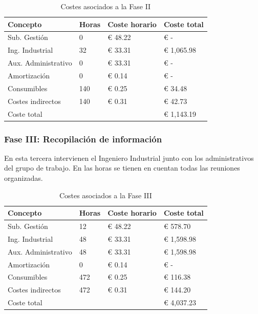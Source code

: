 \begin{table}[H]
    \centering
    \begin{tabular}{llll}
        \toprule
        Concepto            & Horas & Coste horario & Coste total \\
        \midrule
        Sub. Gestión        & 0     & € 48.22       & € -         \\
        Ing. Industrial     & 32    & € 33.31       & € 1,065.98  \\
        Aux. Administrativo & 0     & € 33.31       & € -         \\
        Amortización        & 0     & € 0.14        & € -         \\
        Consumibles         & 140   & € 0.25        & € 34.48     \\
        Costes indirectos   & 140   & € 0.31        & € 42.73     \\
        \midrule
        Coste total         &       &               & € 1,143.19  \\
        \bottomrule
    \end{tabular}
    \caption{Costes asociados a la Fase II}
    \label{tab:fase-formacion}
\end{table}

\subsubsection{Fase III: Recopilación de información}

En esta tercera intervienen el Ingeniero Industrial junto con los administrativos del grupo de trabajo. En las horas se tienen en cuentan todas las reuniones organizadas.

\begin{table}[H]
    \centering
    \begin{tabular}{llll}
        \toprule
        Concepto            & Horas & Coste horario & Coste total \\
        \midrule
        Sub. Gestión        & 12    & € 48.22       & € 578.70    \\
        Ing. Industrial     & 48    & € 33.31       & € 1,598.98  \\
        Aux. Administrativo & 48    & € 33.31       & € 1,598.98  \\
        Amortización        & 0     & € 0.14        & € -         \\
        Consumibles         & 472   & € 0.25        & € 116.38    \\
        Costes indirectos   & 472   & € 0.31        & € 144.20    \\
        \midrule
        Coste total         &       &               & € 4,037.23  \\
        \bottomrule
    \end{tabular}
    \caption{Costes asociados a la Fase III}
    \label{tab:fase-recopilacion}
\end{table}

